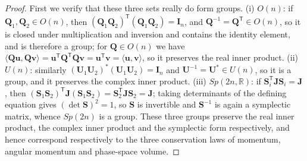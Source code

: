 \begin{proof}
First we verify that these three sets really do form groups. (i) $O(n)$: if $\mathbf{Q}_1, \mathbf{Q}_2 \in O(n)$, then $(\mathbf{Q}_1\mathbf{Q}_2)^{\mathsf T}(\mathbf{Q}_1\mathbf{Q}_2) = \mathbf{I}_n$, and $\mathbf{Q}^{-1} = \mathbf{Q}^{\mathsf T} \in O(n)$, so it is closed under multiplication and inversion and contains the identity element, and is therefore a group; for $\mathbf{Q} \in O(n)$ we have $\langle \mathbf{Q}\mathbf{u}, \mathbf{Q}\mathbf{v} \rangle = \mathbf{u}^{\mathsf T}\mathbf{Q}^{\mathsf T}\mathbf{Q}\mathbf{v} = \mathbf{u}^{\mathsf T}\mathbf{v} = \langle \mathbf{u}, \mathbf{v} \rangle$, so it preserves the real inner product. (ii) $U(n)$: similarly $(\mathbf{U}_1\mathbf{U}_2)^*(\mathbf{U}_1\mathbf{U}_2) = \mathbf{I}_n$ and $\mathbf{U}^{-1} = \mathbf{U}^* \in U(n)$, so it is a group, and it preserves the complex inner product. (iii) $Sp(2n,\mathbb{R})$: if $\mathbf{S}_i^{\mathsf T}\mathbf{J}\mathbf{S}_i = \mathbf{J}$, then $(\mathbf{S}_1\mathbf{S}_2)^{\mathsf T}\mathbf{J}(\mathbf{S}_1\mathbf{S}_2) = \mathbf{S}_2^{\mathsf T}\mathbf{J}\mathbf{S}_2 = \mathbf{J}$; taking determinants of the defining equation gives $(\det\mathbf{S})^2 = 1$, so $\mathbf{S}$ is invertible and $\mathbf{S}^{-1}$ is again a symplectic matrix, whence $Sp(2n)$ is a group. These three groups preserve the real inner product, the complex inner product and the symplectic form respectively, and hence correspond respectively to the three conservation laws of momentum, angular momentum and phase-space volume.
\end{proof}

